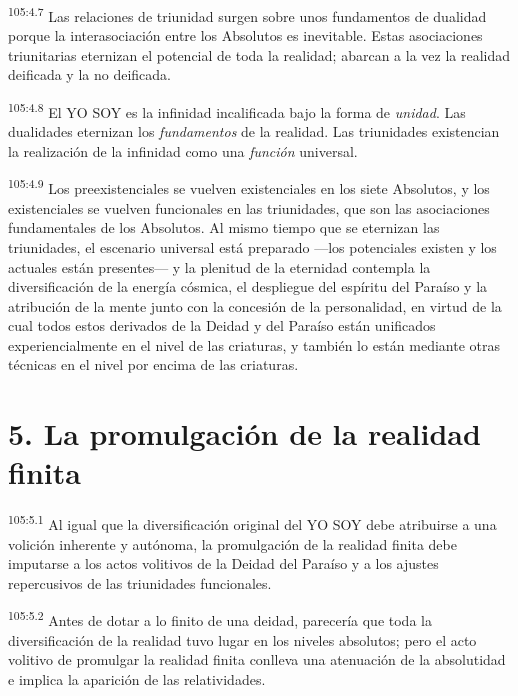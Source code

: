 \par
\textsuperscript{105:4.7} Las relaciones de triunidad surgen sobre unos fundamentos de dualidad porque la interasociación entre los Absolutos es inevitable. Estas asociaciones triunitarias eternizan el potencial de toda la realidad; abarcan a la vez la realidad deificada y la no deificada.

\par
\textsuperscript{105:4.8} El YO SOY es la infinidad incalificada bajo la forma de \textit{unidad}. Las dualidades eternizan los \textit{fundamentos} de la realidad. Las triunidades existencian la realización de la infinidad como una \textit{función} universal.

\par
\textsuperscript{105:4.9} Los preexistenciales se vuelven existenciales en los siete Absolutos, y los existenciales se vuelven funcionales en las triunidades, que son las asociaciones fundamentales de los Absolutos. Al mismo tiempo que se eternizan las triunidades, el escenario universal está preparado ---los potenciales existen y los actuales están presentes--- y la plenitud de la eternidad contempla la diversificación de la energía cósmica, el despliegue del espíritu del Paraíso y la atribución de la mente junto con la concesión de la personalidad, en virtud de la cual todos estos derivados de la Deidad y del Paraíso están unificados experiencialmente en el nivel de las criaturas, y también lo están mediante otras técnicas en el nivel por encima de las criaturas.

\section*{5. La promulgación de la realidad finita}
\par
\textsuperscript{105:5.1} Al igual que la diversificación original del YO SOY debe atribuirse a una volición inherente y autónoma, la promulgación de la realidad finita debe imputarse a los actos volitivos de la Deidad del Paraíso y a los ajustes repercusivos de las triunidades funcionales.

\par
\textsuperscript{105:5.2} Antes de dotar a lo finito de una deidad, parecería que toda la diversificación de la realidad tuvo lugar en los niveles absolutos; pero el acto volitivo de promulgar la realidad finita conlleva una atenuación de la absolutidad e implica la aparición de las relatividades.


